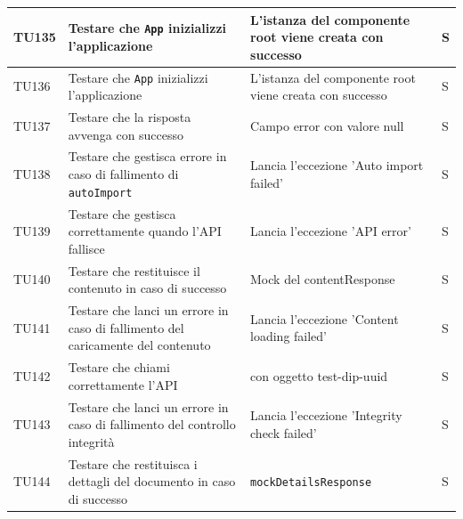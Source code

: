 \documentclass[a4paper,12pt]{article}
\begin{document}
\begin{longtable}{|M{1.2cm}|M{5cm}|M{8cm}|M{1.5cm}|}
            TU135 & Testare che \texttt{App} inizializzi l'applicazione & L'istanza del componente root viene creata con successo & S \\
            \hline

            TU136 & Testare che \texttt{App} inizializzi l'applicazione & L'istanza del componente root viene creata con successo & S \\
            \hline

            TU137 & Testare che \texttt{} la risposta avvenga con successo & Campo error con valore null & S \\
            \hline

            TU138 & Testare che \texttt{} gestisca errore in caso di fallimento di \texttt{autoImport} & Lancia l'eccezione 'Auto import failed' & S \\
            \hline

            TU139 & Testare che \texttt{} gestisca correttamente quando l'API fallisce & Lancia l'eccezione 'API error' & S \\
            \hline

            TU140 & Testare che \texttt{} restituisce il contenuto in caso di successo & Mock del contentResponse & S \\
            \hline

            TU141 & Testare che \texttt{} lanci un errore in caso di fallimento del caricamente del contenuto & Lancia l'eccezione 'Content loading failed' & S \\
            \hline

            TU142 & Testare che \texttt{} chiami correttamente l'API & \texttt{} con oggetto test-dip-uuid & S \\
            \hline

            TU143 & Testare che \texttt{} lanci un errore in caso di fallimento del controllo integrità & Lancia l'eccezione 'Integrity check failed' & S \\
            \hline

            TU144 & Testare che \texttt{} restituisca i dettagli del documento in caso di successo & \texttt{mockDetailsResponse}  & S \\
            \hline


\end{longtable}
\end{document}
